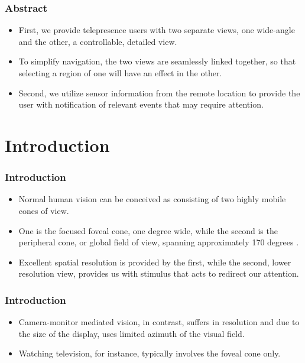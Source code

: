\documentclass{beamer}
\begin{document}
\begin{frame}
\frametitle{Abstract}

\begin{itemize}
\item First, we provide telepresence users with two separate views, one wide-angle and the other, a controllable, detailed view.
\item To simplify navigation, the two views are seamlessly linked together, so that selecting a region of one will have an effect in the other.
\item Second, we utilize sensor information from the remote location to provide the user with notification of relevant events that may require attention.
\end{itemize}

\end{frame}

\section[Introduction]{Introduction}


\begin{frame}
\frametitle{Introduction}

\begin{itemize}
\item Normal human vision can be conceived as consisting of two highly mobile cones of view.
\item One is the focused foveal cone, one degree wide, while the second is the peripheral cone, or global field of view, spanning approximately 170 degrees .
\item Excellent spatial resolution is provided by the first, while the second, lower resolution view, provides us with stimulus that acts to redirect our attention.
\end{itemize}

\end{frame}

\begin{frame}
\frametitle{Introduction}

\begin{itemize}
\item Camera-monitor mediated vision, in contrast, suffers in resolution and due to the size of the display, uses limited azimuth of the visual field.
\item Watching television, for instance, typically involves the foveal cone only.
\end{itemize}

\end{frame}
\end{document}
